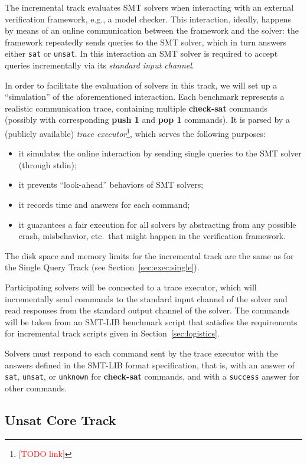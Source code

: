 \documentclass[12pt]{article}
\newcommand{\akey}[1]{\textbf{#1}}
\newcommand{\rem}[1]{\textcolor{red}{[#1]}}
\newcommand{\todo}[1]{\rem{TODO #1}}
\newcommand{\main}{Single Query\xspace}
\newcommand{\ucore}{Unsat Core\xspace}
\begin{document}
The incremental track evaluates SMT solvers when interacting with an
external verification framework, e.g., a model checker. This
interaction, ideally, happens by means of an online communication
between the framework and the solver: the framework repeatedly sends
queries to the SMT solver, which in turn answers either \texttt{sat}
or \texttt{unsat}.  In this interaction an SMT solver is required to
accept queries incrementally via its \emph{standard input channel}.

In order to facilitate the evaluation of solvers in this track, we will set up
a ``simulation'' of the aforementioned interaction.  Each benchmark represents
a realistic communication trace, containing multiple \akey{check-sat} commands
(possibly with corresponding \akey{push 1} and \akey{pop 1} commands). It is
parsed by a (publicly available) \emph{trace executor}\footnote{\todo{link}},
which serves the following purposes: \begin{itemize} \item it simulates the
online interaction by sending single queries to the SMT solver (through stdin);
\item it prevents ``look-ahead'' behaviors of SMT solvers;
\item it records time and answers for each command;
\item it guarantees a fair execution for all solvers by abstracting
  from any possible crash, misbehavior, etc.\ that might happen in the
  verification framework.
\end{itemize}

The disk space and memory limits for the incremental track are the
same as for the \main Track (see Section~\ref{sec:exec:single}).

%
Participating solvers will be connected to a trace executor, which
will incrementally send commands to the standard input channel of the
solver and read responses from the standard output channel of the
solver.  The commands will be taken from an SMT-LIB benchmark script
that satisfies the requirements for incremental track scripts given in
Section~\ref{sec:logistics}.

Solvers must respond to each command sent by the trace executor with
the answers defined in the SMT-LIB format specification, that is, with
an answer of \texttt{sat}, \texttt{unsat}, or \texttt{unknown} for
\akey{check-sat} commands, and with a \texttt{success} answer for
other commands.

\subsection{\ucore Track}
\label{sec:exec:unsat-core}
\end{document}
